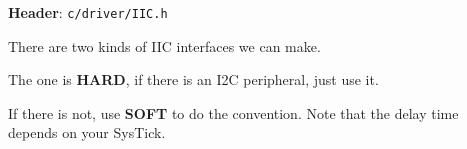 \textbf{Header}: \verb|c/driver/IIC.h|

There are two kinds of IIC interfaces we can make.

The one is \textbf{HARD}, if there is an I2C peripheral, just use it.

If there is not, use \textbf{SOFT} to do the convention. Note that the delay time depends on your SysTick.

